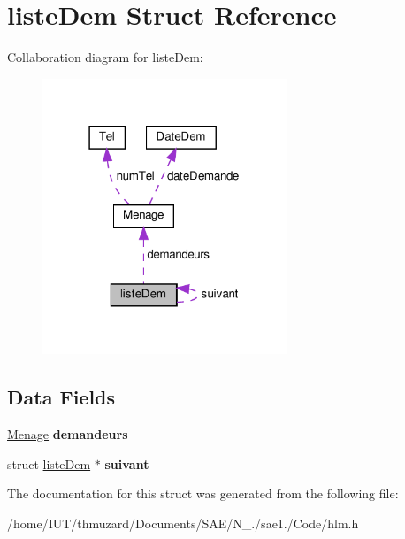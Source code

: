 \hypertarget{structliste_dem}{}\section{liste\+Dem Struct Reference}
\label{structliste_dem}


Collaboration diagram for liste\+Dem\+:
\nopagebreak
\begin{figure}[H]
\begin{center}
\leavevmode
\includegraphics[width=207pt]{structliste_dem__coll__graph}
\end{center}
\end{figure}
\subsection*{Data Fields}
\begin{DoxyCompactItemize}
\item 
\mbox{\label{structliste_dem_a76e6c62c1b79181ed799adda3abf7ddb}} 
\hyperlink{struct_menage}{Menage} {\bfseries demandeurs}
\item 
\mbox{\label{structliste_dem_a8c4767137afdf35dde77dc1b9d27dfd2}} 
struct \hyperlink{structliste_dem}{liste\+Dem} $\ast$ {\bfseries suivant}
\end{DoxyCompactItemize}


The documentation for this struct was generated from the following file\+:\begin{DoxyCompactItemize}
\item 
/home/\+I\+U\+T/thmuzard/\+Documents/\+S\+A\+E/\+N\+\_./sae1./\+Code/hlm.\+h\end{DoxyCompactItemize}
